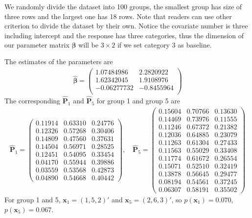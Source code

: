 \documentclass[12pt]{article}
\newcommand{\betavec}{{\boldsymbol{\beta}}}
\newcommand{\Pmat}{\mathbf{P}}
\newcommand{\wh}{\widehat}
\newcommand{\xvec}{\boldsymbol{x}}
\begin{document}
We randomly divide the dataset into 100 groups, the smallest group has size of three rows and the largest one has 18 rows. Note that readers can use other criterion to divide the dataset by their own. Notice the covariate number is three including intercept and the response has three categories, thus the dimension of our parameter matrix $\betavec$ will be $3 \times 2$ if we set category 3 as baseline.

The estimates of the parameters are
\begin{align*}
\wh{\betavec} =
\begin{pmatrix}
 1.07484986 & 2.2820922 \\
 1.62342045 & 1.9108976 \\
 -0.06277732 &-0.8455964\\
\end{pmatrix}
\end{align*}
The corresponding $\wh{\Pmat}_1$ and $\wh{\Pmat}_5$ for group 1 and group 5 are
\begin{align*}
\wh{\Pmat}_1 = \begin{pmatrix}
 0.11914 & 0.63310 & 0.24776\\
 0.12326 & 0.57268 & 0.30406\\
 0.14809 & 0.47560 & 0.37631\\
 0.14504 & 0.56971 & 0.28525\\
 0.12451 & 0.54095 & 0.33454\\
 0.04170 & 0.55944 & 0.39886\\
 0.03559 & 0.53568 & 0.42873\\
 0.04890 & 0.54668 & 0.40442
\end{pmatrix}, \quad
    \wh{\Pmat}_5= \begin{pmatrix}
 0.15604 & 0.70766 & 0.13630\\
 0.14469 & 0.73976 & 0.11555\\
 0.11246 & 0.67372 & 0.21382\\
 0.12036 & 0.64885 & 0.23079\\
 0.11263 & 0.61304 & 0.27433\\
 0.11563 & 0.55029 & 0.33408\\
 0.11774 & 0.61672 & 0.26554\\
 0.15071 & 0.52510 & 0.32419\\
 0.13878 & 0.56645 & 0.29477\\
 0.08194 & 0.54561 & 0.37245\\
 0.06307 & 0.58191 & 0.35502
    \end{pmatrix}
\end{align*}
For group 1 and 5, $\xvec_1 = (1,5,2)'$ and $\xvec_5 = (2,6,3)'$, so $p(\xvec_1) = 0.070$, $p(\xvec_5) = 0.067$.
\end{document}
